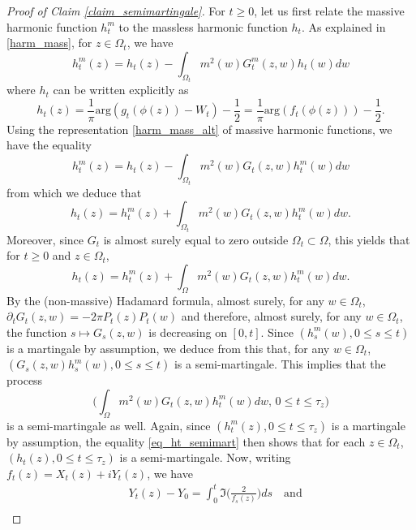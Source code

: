 \documentclass{article}
\theoremstyle{definition}
\theoremstyle{remark}
\theoremstyle{remark}
\begin{document}
\begin{proof}[Proof of Claim \ref{claim_semimartingale}]
For $t \geq 0$, let us first relate the massive harmonic function $h_t^m$ to the massless harmonic function $h_t$. As explained in \eqref{harm_mass}, for $z \in \Omega_t$, we have
\begin{equation} \label{hm_with0}
    h_t^m(z) = h_t(z) - \int_{\Omega_t} m^2(w)G_t^m(z,w)h_t(w) dw 
\end{equation}
where $h_t$ can be written explicitly as
\begin{equation*}
    h_t(z) = \frac{1}{\pi}\text{arg}(g_t(\phi(z))-W_t) - \frac{1}{2}= \frac{1}{\pi}\text{arg}(f_t(\phi(z))) - \frac{1}{2}.
\end{equation*}
Using the representation \eqref{harm_mass_alt} of massive harmonic functions, we have the equality
\begin{equation*}
    h_t^m(z) = h_t(z) - \int_{\Omega_t} m^2(w)G_t(z,w)h_t^m(w) dw
\end{equation*}
from which we deduce that
\begin{equation*}
    h_t(z) = h_t^m(z) + \int_{\Omega_t} m^2(w)G_t(z,w)h_t^m(w) dw.
\end{equation*}
Moreover, since $G_t$ is almost surely equal to zero outside $\Omega_t\subset \Omega$, this yields that for $t \geq 0$ and $z \in \Omega_t$,
\begin{equation} \label{eq_ht_semimart}
     h_t(z) = h_t^m(z) + \int_{\Omega} m^2(w)G_t(z,w)h_t^m(w) dw.
\end{equation}
By the (non-massive) Hadamard formula, almost surely, for any $w \in \Omega_t$, $\partial_t G_t(z,w) = -2\pi P_t(z) P_t(w)$ and therefore, almost surely, for any $ w \in \Omega_t$, the function $s \mapsto G_s(z,w)$ is decreasing on $[0,t]$. Since $(h_s^m(w), 0 \leq s \leq t)$ is a martingale by assumption, we deduce from this that, for any $w \in \Omega_t$, $(G_s(z,w)h_s^m(w), 0 \leq s \leq t)$ is a semi-martingale. This implies that the process 
\begin{equation*}
    \bigg(\int_{\Omega} m^2(w)G_t(z,w)h_t^m(w) dw, \, 0 \leq t \leq \tau_z \bigg)
\end{equation*}
is a semi-martingale as well. Again, since $(h_t^m(z), 0 \leq t \leq \tau_z)$ is a martingale by assumption, the equality \eqref{eq_ht_semimart} then shows that for each $z \in \Omega_t$, $(h_t(z), 0 \leq t \leq \tau_z)$ is a semi-martingale. Now, writing $f_t(z)=X_t(z)+iY_t(z)$, we have
\begin{align*}
    & Y_t(z) - Y_0 = \int_{0}^{t} \Im \bigg( \frac{2}{f_s(z)} \bigg) ds \quad \text{and} \\

\end{align*}
\end{proof}
\end{document}
